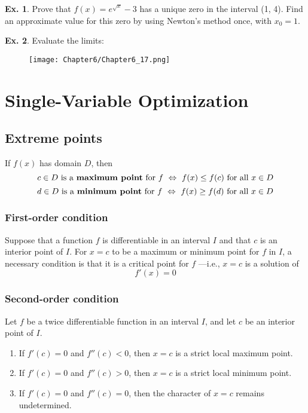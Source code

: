 \documentclass[10pt,a4paper]{book}
\theoremstyle{definition}\newtheorem{definition}{Definition}
\theoremstyle{definition}\newtheorem{fact}{Fact}
\theoremstyle{definition}\newtheorem{ex}{Ex.}
\theoremstyle{definition}\newtheorem{project}{Project}
\theoremstyle{definition}\newtheorem{problem}{Problem}
\theoremstyle{definition}\newtheorem{example}{Example}
\numberwithin{theorem}{chapter}
\numberwithin{corollary}{chapter}
\numberwithin{assumption}{chapter}
\numberwithin{definition}{chapter}
\numberwithin{prop}{chapter}
\numberwithin{notation}{chapter}
\numberwithin{problem}{chapter}
\numberwithin{example}{chapter}
\numberwithin{fact}{chapter}
\numberwithin{ex}{chapter}
\begin{document}
	\begin{ex}
		Prove that $f (x) = e^{\sqrt{x}} - 3$ has a unique zero in the interval (1, 4). Find an approximate value for this zero by using Newton’s method once, with $x_0 = 1$.
	\end{ex}
	
	\begin{ex}
		Evaluate the limits:
		\begin{figure}[H]
			\centering
			\texttt{[image: Chapter6/Chapter6\_17.png]}
		\end{figure}
	\end{ex}
	
	
	\chapter{Single-Variable Optimization}
	
	\section{Extreme points}
	
	If $f (x)$ has domain $D$, then
	$$c \in D \text{ is a \textbf{maximum point} for } f \,\,\Leftrightarrow\,\,f(x) \leq f(c) \text{ for all } x \in D$$
	$$d \in D \text{ is a \textbf{minimum point} for } f \,\,\Leftrightarrow\,\,f(x) \geq f(d) \text{ for all } x \in D$$
	
	\subsection{First-order condition}
	
	Suppose that a function $f$ is differentiable in an interval $I$ and that $c$ is an interior point of $I$. For $x = c$ to be a maximum or minimum point for $f$ in $I$, a necessary condition is that it is a critical point for $f$ —i.e., $x = c$ is a solution of
	$$f'(x)=0$$
	
	\subsection{Second-order condition}
	
	Let $f$ be a twice differentiable function in an interval $I$, and let $c$ be an interior point of $I$.
	\begin{enumerate}[label=(\alph*)]
		\item If $f'(c) = 0$ and $f''(c) < 0$, then $x = c$ is a strict local maximum point.
		\item If $f'(c) = 0$ and $f''(c) > 0$, then $x = c$ is a strict local minimum point.
		\item If $f'(c) = 0$ and $f''(c) = 0$, then the character of $x = c$ remains undetermined.
	\end{enumerate}
	
\end{document}
